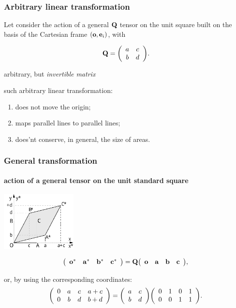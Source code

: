 \documentclass{beamer}
\begin{document}
\begin{frame}\frametitle{Arbitrary linear transformation}

\vfill

Let consider the action of a general ${\bf Q}$  tensor on the unit square built on the basis of the Cartesian frame $({\bf o},
{\bf e}_{i})$, with

\[
{\bf Q} = {\left(\begin{array}{cccccccccccccccccccccccccccc}a & c\\
             b & d\end{array}\right)}.
\]

arbitrary, but \emph{invertible matrix}

\vfill

such arbitrary linear transformation:

\begin{enumerate}
\vfill\item\vspace{-2mm} does not move the origin;
\vfill\item\vspace{-2mm} maps parallel lines to parallel lines;
\vfill\item\vspace{-2mm} does'nt conserve, in general, the size of areas.
\end{enumerate}

\end{frame}
\begin{frame}\frametitle{General transformation}
\framesubtitle{action of a general tensor on the unit standard square}\small

\begin{center}
\includegraphics[height=30mm]{images/qualunque}
\end{center}

\[
{\left(\begin{array}{cccccccccccccccccccccccccccc}
{\bf o}^* & {\bf a}^* & {\bf b}^* & {\bf c}^* \end{array}\right)}
=
{\bf Q}{\left(\begin{array}{cccccccccccccccccccccccccccc}
{\bf o} & {\bf a} & {\bf b} & {\bf c} \end{array}\right)},
\]

or, by using the corresponding  coordinates:
\[
{\left(\begin{array}{cccccccccccccccccccccccccccc}
0 & a & c & a+c\\
0 & b & d & b+d\end{array}\right)}
=
{\left(\begin{array}{cccccccccccccccccccccccccccc}
a & c\\
b & d
\end{array}\right)}
{\left(\begin{array}{cccccccccccccccccccccccccccc}
0 & 1 & 0 & 1\\
0 & 0 & 1 & 1\end{array}\right)}.
\]

\end{frame}
\end{document}
